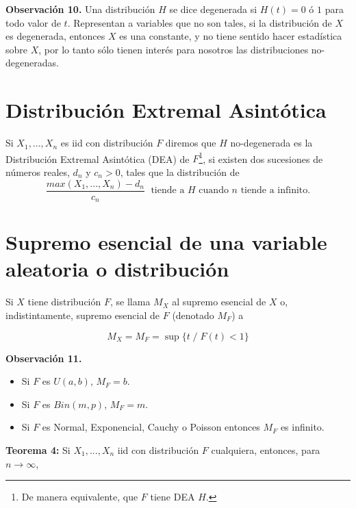 \documentclass[
  20pt,
]{book}
\providecommand{\tightlist}{%
  \setlength{\itemsep}{0pt}\setlength{\parskip}{0pt}}
\theoremstyle{definition}
\theoremstyle{definition}
\theoremstyle{definition}
\theoremstyle{definition}
\theoremstyle{remark}
\begin{document}
\textbf{Observación 10.} Una distribución \(H\) se dice degenerada si \(H(t)=0 \text{ ó } 1\) para todo valor de \(t\). Representan a variables que no son tales, si la distribución de \(X\) es degenerada, entonces \(X\) es una constante, y no tiene sentido
hacer estadística sobre \(X\), por lo tanto sólo tienen
interés para nosotros las distribuciones no-degeneradas.

\section{Distribución Extremal Asintótica}\label{distribuciuxf3n-extremal-asintuxf3tica}

Si \(X_1,...,X_n\) es iid con distribución \(F\) diremos que \(H\) no-degenerada es la Distribución Extremal Asintótica
(DEA) de \(F\)\footnote{De manera equivalente, que \(F\) tiene DEA \(H\).}, si existen dos sucesiones de números reales, \(d_n\) y \(c_n>0\), tales que la distribución de
\begin{equation}
\frac{max(X_1,...,X_n)- d_n}{c_n}\;\text{ tiende a } H \text{ cuando } n \text{ tiende a infinito.}
\end{equation}

\section{Supremo esencial de una variable aleatoria o distribución}\label{supremo-esencial-de-una-variable-aleatoria-o-distribuciuxf3n}

Si \(X\) tiene distribución \(F\),
se llama \(M_X\) al supremo esencial de \(X\) o,
indistintamente, supremo esencial de \(F\) (denotado
\(M_F\)) a

\begin{equation}
M_X = M_F = \sup\{t \; / \; F(t) < 1\}
\end{equation}

\textbf{Observación 11.}

\begin{itemize}
\tightlist
\item
  Si \(F\) es \(U(a,b)\), \(M_F=b\).
\item
  Si \(F\) es \(Bin(m,p)\), \(M_F=m\).
\item
  Si \(F\) es Normal, Exponencial, Cauchy o Poisson entonces \(M_F\) es infinito.
\end{itemize}

\textbf{Teorema 4:} Si \(X_1,...,X_n\) iid con distribución \(F\) cualquiera, entonces, para \(n \rightarrow \infty\),
\end{document}
